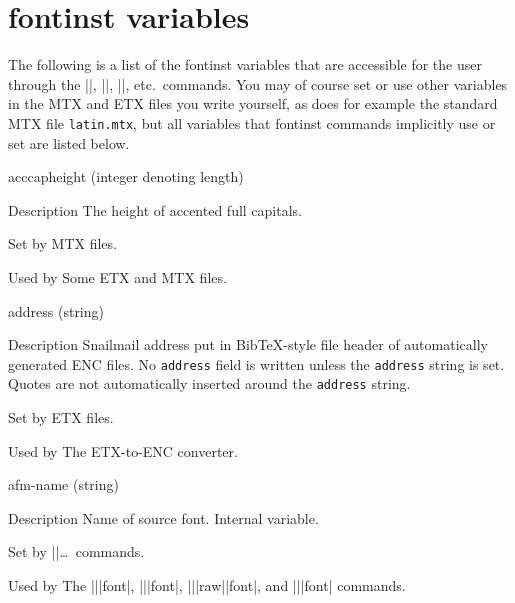 \documentclass[a4paper]{ltxguide}
\newenvironment{smalldes}{%
   \list{}{%
      \setlength\labelwidth{0pt}%
      \setlength\itemindent{-\leftmargin}%
      \setlength\listparindent{1em}%
      \setlength\parsep{0pt}%
      \setlength\itemsep{0pt plus 1pt}%
      \setlength\topsep{\itemsep}%
      \let\makelabel\descriptionlabel
   }%
}{\endlist}
\newcommand*{\setpackagename}[1]{\textsf{#1}}
\newcommand{\fontinst}{\setpackagename{font\-inst}\xspace}
\newcommand{\BibTeX}{Bib\TeX}
\begin{document}
\section{\fontinst variables}

The following is a list of the \fontinst variables that are 
accessible for the user through the |\set|\textellipsis, 
|\reset|\textellipsis, |\unset|\textellipsis, etc.\ commands. You may 
of course set or use other variables in the MTX and ETX files you 
write yourself, as does for example the standard MTX file 
\texttt{latin.mtx}, but all variables that \fontinst commands 
implicitly use or set are listed below.

\begin{list}{}{%
   \setlength{}%
   \setlength\itemindent{-\leftmargin}%
   \setlength\parsep{0pt}
   \def\makelabel#1{\hspace\labelsep \normalfont\ttfamily #1}%
}
  \item[acccapheight] (integer denoting length)
    \begin{smalldes}
      \item[Description] The height of accented full capitals.
      \item[Set by] MTX files.
      \item[Used by] Some ETX and MTX files.
    \end{smalldes}
  \item[address] (string)
    \begin{smalldes}
      \item[Description] Snailmail address put in \BibTeX-style file 
        header of automatically generated ENC files. No 
        \texttt{address} field is written unless the \texttt{address} 
        string is set. Quotes are not automatically inserted around 
        the \texttt{address} string.
      \item[Set by] ETX files.
      \item[Used by] The ETX-to-ENC converter.
    \end{smalldes}
  \item[afm-name] (string)
    \begin{smalldes}
      \item[Description] Name of source font. Internal variable.
      \item[Set by] |\from|\dots\ commands.
      \item[Used by] The |\transform|\-|font|, |\install|\-|font|, 
        |\install|\-|raw|\-|font|, and |\reglyph|\-|font| commands.
    \end{smalldes}

\end{list}
\end{document}

